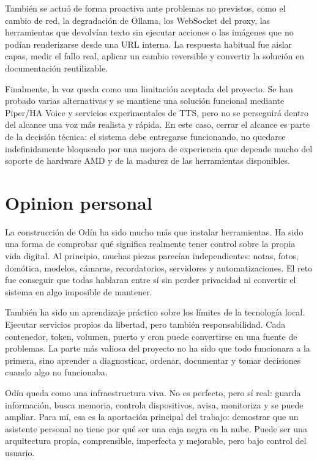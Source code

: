 También se actuó de forma proactiva ante problemas no previstos, como el cambio de red, la degradación de Ollama, los WebSocket del proxy, las herramientas que devolvían texto sin ejecutar acciones o las imágenes que no podían renderizarse desde una URL interna. La respuesta habitual fue aislar capas, medir el fallo real, aplicar un cambio reversible y convertir la solución en documentación reutilizable.

Finalmente, la voz queda como una limitación aceptada del proyecto. Se han probado varias alternativas y se mantiene una solución funcional mediante Piper/HA Voice y servicios experimentales de TTS, pero no se perseguirá dentro del alcance una voz más realista y rápida. En este caso, cerrar el alcance es parte de la decisión técnica: el sistema debe entregarse funcionando, no quedarse indefinidamente bloqueado por una mejora de experiencia que depende mucho del soporte de hardware AMD y de la madurez de las herramientas disponibles.

\section{Opinion personal}
La construcción de Odín ha sido mucho más que instalar herramientas. Ha sido una forma de comprobar qué significa realmente tener control sobre la propia vida digital. Al principio, muchas piezas parecían independientes: notas, fotos, domótica, modelos, cámaras, recordatorios, servidores y automatizaciones. El reto fue conseguir que todas hablaran entre sí sin perder privacidad ni convertir el sistema en algo imposible de mantener.

También ha sido un aprendizaje práctico sobre los límites de la tecnología local. Ejecutar servicios propios da libertad, pero también responsabilidad. Cada contenedor, token, volumen, puerto y cron puede convertirse en una fuente de problemas. La parte más valiosa del proyecto no ha sido que todo funcionara a la primera, sino aprender a diagnosticar, ordenar, documentar y tomar decisiones cuando algo no funcionaba.

Odín queda como una infraestructura viva. No es perfecto, pero sí real: guarda información, busca memoria, controla dispositivos, avisa, monitoriza y se puede ampliar. Para mí, esa es la aportación principal del trabajo: demostrar que un asistente personal no tiene por qué ser una caja negra en la nube. Puede ser una arquitectura propia, comprensible, imperfecta y mejorable, pero bajo control del usuario.
